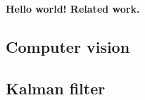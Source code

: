 \documentclass[../../main]{subfiles}
\begin{document}
\textbf{Hello world! Related work.}

\subsection{Computer vision}

\newpage

\subsection{Kalman filter}

\newpage

%

%

%

%
\end{document}
